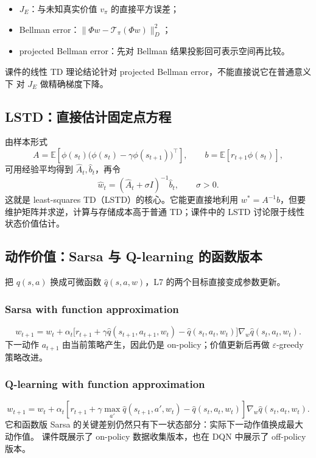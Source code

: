 \documentclass[11pt,a4paper,fontset=fandol]{ctexart}
\newcommand{\E}{\mathbb{E}}
\begin{document}
\begin{warningbox}[不要把三个误差混成一个]
\begin{itemize}
  \item \(J_E\)：与未知真实价值 \(v_\pi\) 的直接平方误差；
  \item Bellman error：\(\|\Phi w-\mathcal T_\pi(\Phi w)\|_D^2\)；
  \item projected Bellman error：先对 Bellman 结果投影回可表示空间再比较。
\end{itemize}
课件的线性 TD 理论结论针对 projected Bellman error，不能直接说它在普通意义下
对 \(J_E\) 做精确梯度下降。
\end{warningbox}

\subsection{LSTD：直接估计固定点方程}

由样本形式
\[
A=\E\!\left[
\phi(s_t)\bigl(\phi(s_t)-\gamma\phi(s_{t+1})\bigr)^\top
\right],
\qquad
b=\E[r_{t+1}\phi(s_t)],
\]
可用经验平均得到 \(\hat A_t,\hat b_t\)，再令
\[
\hat w_t=(\hat A_t+\sigma I)^{-1}\hat b_t,
\qquad \sigma>0.
\]
这就是 least-squares TD（LSTD）的核心。它能更直接地利用
\(w^*=A^{-1}b\)，但要维护矩阵并求逆，计算与存储成本高于普通 TD；课件中的
LSTD 讨论限于线性状态价值估计。

\subsection{动作价值：Sarsa 与 Q-learning 的函数版本}

把 \(q(s,a)\) 换成可微函数 \(\hat q(s,a,w)\)，L7 的两个目标直接变成参数更新。

\subsubsection{Sarsa with function approximation}

\[
\boxed{
w_{t+1}=w_t+\alpha_t
\bigl[r_{t+1}+\gamma\hat q(s_{t+1},a_{t+1},w_t)
-\hat q(s_t,a_t,w_t)\bigr]
\nabla_w\hat q(s_t,a_t,w_t)}.
\]
下一动作 \(a_{t+1}\) 由当前策略产生，因此仍是 on-policy；价值更新后再做
\(\varepsilon\)-greedy 策略改进。

\subsubsection{Q-learning with function approximation}

\[
\boxed{
w_{t+1}=w_t+\alpha_t
\left[r_{t+1}+\gamma\max_{a'}\hat q(s_{t+1},a',w_t)
-\hat q(s_t,a_t,w_t)\right]
\nabla_w\hat q(s_t,a_t,w_t)}.
\]
它和函数版 Sarsa 的关键差别仍然只有下一状态部分：实际下一动作值换成最大动作值。
课件既展示了 on-policy 数据收集版本，也在 DQN 中展示了 off-policy 版本。
\end{document}
